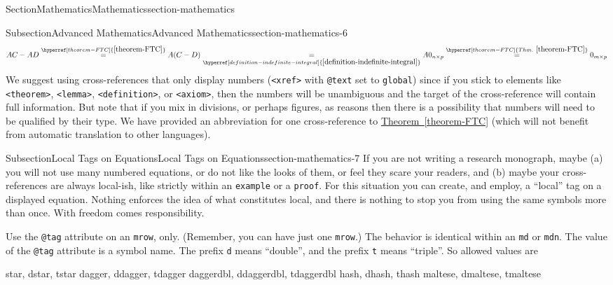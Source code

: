\documentclass[twoside,10pt,]{article}
\newcommand{\xreffont}{\relax}
\newcommand{\mono}[1]{\texttt{#1}}
\numberwithin{equation}{section}
\begin{document}
\begin{sectionptx}{Section}{Mathematics}{}{Mathematics}{}{}{section-mathematics}
\begin{subsectionptx}{Subsection}{Advanced Mathematics}{}{Advanced Mathematics}{}{}{section-mathematics-6}
\begin{equation*}
AC-AD
\overset{\hyperref[theorem-FTC]{{\xreffont\ref{theorem-FTC}}}}{=}
A(C-D)
\underset{\hyperref[definition-indefinite-integral]{{\xreffont\ref{definition-indefinite-integral}}}}{=}
A0_{n\times p}
\overset{\hyperref[theorem-FTC]{Thm.~{\xreffont\ref{theorem-FTC}}}}{=}
0_{m\times p}
\end{equation*}
We suggest using cross-references that only display numbers (\mono{<xref>} with \mono{@text} set to \mono{global}) since if you stick to elements like \mono{<theorem>}, \mono{<lemma>}, \mono{<definition>}, or \mono{<axiom>}, then the numbers will be unambiguous and the target of the cross-reference will contain full information.  But note that if you mix in divisions, or perhaps figures, as reasons then there is a possibility that numbers will need to be qualified by their type.  We have provided an abbreviation for one cross-reference to \hyperref[theorem-FTC]{Theorem~{\xreffont\ref{theorem-FTC}}} (which will not benefit from automatic translation to other languages).%
\end{subsectionptx}
%
%
\typeout{************************************************}
\typeout{************************************************}
%
\begin{subsectionptx}{Subsection}{Local Tags on Equations}{}{Local Tags on Equations}{}{}{section-mathematics-7}
If you are not writing a research monograph, maybe (a) you will not use many numbered equations, or do not like the looks of them, or feel they scare your readers, and (b) maybe your cross-references are always local-ish, like strictly within an \mono{example} or a \mono{proof}.  For this situation you can create, and employ, a ``local'' tag on a displayed equation.  Nothing enforces the idea of what constitutes local, and there is nothing to stop you from using the same symbols more than once.  With freedom comes responsibility.%
\par
Use the \mono{@tag} attribute on an \mono{mrow}, only.  (Remember, you can have just one \mono{mrow}.)  The behavior is identical within an \mono{md} or \mono{mdn}.  The value of the \mono{@tag} attribute is a symbol name.  The prefix \mono{d} means ``double'', and the prefix \mono{t} means ``triple''.  So allowed values are%
\begin{codedisplay}
star, dstar, tstar
dagger, ddagger, tdagger
daggerdbl, ddaggerdbl, tdaggerdbl
hash, dhash, thash
maltese, dmaltese, tmaltese
\end{codedisplay}

\end{subsectionptx}
\end{sectionptx}
\end{document}

